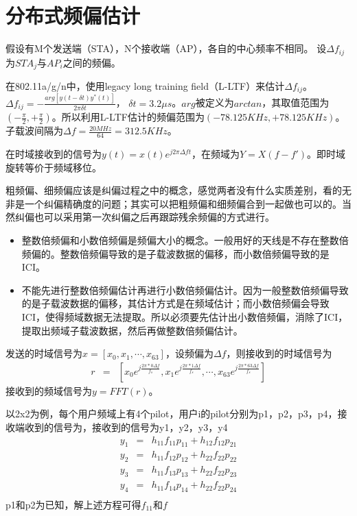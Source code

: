 
\section{分布式频偏估计}

假设有M个发送端（STA），N个接收端（AP），各自的中心频率不相同。
设$\Delta f_{ij}$为$STA_{j}$与$AP_{i}$之间的频偏。

在802.11a/g/n中，使用legacy long training field（L-LTF）来估计$\Delta f_{ij}$。
$\Delta f_{ij} = -\frac{arg[ y(t - \delta t)y^{*}(t)  ]}{2 \pi \delta t}$， $\delta t = 3.2 \mu s$。$arg$被定义为$arctan$，其取值范围为$(-\frac{\pi}{2}, +\frac{\pi}{2})$。所以利用L-LTF估计的频偏范围为$(-78.125KHz, +78.125KHz)$。
子载波间隔为$\Delta f = \frac{20MHz}{64} = 312.5KHz$。

在时域接收到的信号为$y(t)=x(t) e^{j2 \pi \Delta f t}$，在频域为$Y = X(f - f')$。即时域旋转等价于频域移位。

粗频偏、细频偏应该是纠偏过程之中的概念，感觉两者没有什么实质差别，看的无非是一个纠偏精确度的问题；其实可以把粗频偏和细频偏合到一起做也可以的。当然纠偏也可以采用第一次纠偏之后再跟踪残余频偏的方式进行。
\begin{itemize}
\item 整数倍频偏和小数倍频偏是频偏大小的概念。一般用好的天线是不存在整数倍频偏的。整数倍频偏导致的是子载波数据的偏移，而小数倍频偏导致的是ICI。
\item 不能先进行整数倍频偏估计再进行小数倍频偏估计。因为一般整数倍频偏导致的是子载波数据的偏移，其估计方式是在频域估计；而小数倍频偏会导致ICI，使得频域数据无法提取。所以必须要先估计出小数倍频偏，消除了ICI，提取出频域子载波数据，然后再做整数倍频偏估计。
\end{itemize}

发送的时域信号为$x=[x_{0}, x_{1}, \cdots, x_{63}]$，设频偏为$\Delta f$，则接收到的时域信号为
\begin{eqnarray}
r&=&[x_{0}e^{j\frac{2\pi*0\Delta f}{f_{s}}}, x_{1}e^{j\frac{2\pi*1\Delta f}{f_{s}}}, \cdots, x_{63}e^{j\frac{2\pi*63\Delta f}{f_{s}}}]
\end{eqnarray}
接收到的频域信号为$y=FFT(r)$。











以2x2为例，每个用户频域上有4个pilot，用户i的pilot分别为p1，p2，p3，p4，接收端收到的信号为，接收到的信号为y1，y2，y3，y4
\begin{eqnarray}
y_{1} & = & h_{11}f_{11}p_{11} + h_{12}f_{12}p_{21} \\
y_{2} & = & h_{11}f_{12}p_{12} + h_{22}f_{22}p_{22} \\
y_{3} & = & h_{11}f_{13}p_{13} + h_{22}f_{22}p_{23} \\
y_{4} & = & h_{11}f_{14}p_{14} + h_{22}f_{22}p_{24} \\
\end{eqnarray}
p1和p2为已知，解上述方程可得$f_{11}$和$f_{}$

